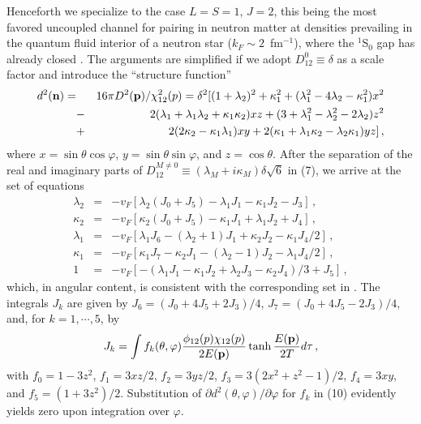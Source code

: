 Henceforth we specialize to the case $L=S=1$, $J=2$, this being 
the most favored uncoupled channel for pairing in neutron matter 
at densities prevailing in the quantum fluid interior of a neutron
star ($k_F\sim 2$~fm$^{-1}$), where the $^1$S$_0$ gap has already 
closed \cite{tak,kkc}.  The arguments are simplified if we adopt 
$D^0_{12}\equiv\delta$ as a scale factor and introduce the 
``structure function'' 
\begin{eqnarray}
    d^2({\bf n}) = 
&& 16\pi D^2({\bf p})/\chi_{12}^2(p)
   = \delta^2[(1+\lambda_2)^2+\kappa^2_1
     +(\lambda_1^2-4\lambda_2-\kappa^2_1)x^2 \nonumber\\
&-& 2(\lambda_1+ \lambda_1\lambda_2+\kappa_1\kappa_2) xz 
    +(3+\lambda^2_1-\lambda^2_2-2\lambda_2)z^2\nonumber\\
&+& 2(2\kappa_2-\kappa_1\lambda_1)xy
    +2(\kappa_1+ \lambda_1\kappa_2-\lambda_2\kappa_1)yz] \, ,
\end{eqnarray}
where $x=\sin\theta\cos\varphi$, 
$y=\sin\theta\sin\varphi$, and $z=\cos\theta$.  
After the separation of the real and imaginary parts of 
$D^{M\neq 0}_{12}\equiv (\lambda_M+i\kappa_M)\delta\sqrt{6}$ in (7), 
we arrive at the set of equations
\begin{eqnarray}
    \lambda_2
&=& -v_F[\lambda_2(J_0+J_5) -\lambda_1 J_1 -\kappa_1J_2-J_3]\, ,\nonumber \\
    \kappa_2
&=& -v_F[\kappa_2(J_0+J_5) -\kappa_1 J_1 +\lambda_1J_2+J_4] \, ,\nonumber\\
    \lambda_1
&=& -v_F[\lambda_1J_6-(\lambda_2+1)J_1+\kappa_2J_2-\kappa_1J_4/2]\, ,\nonumber\\
     \kappa_1
&=& -v_F[\kappa_1J_7-\kappa_2J_1-(\lambda_2-1)J_2-\lambda_1 J_4/2]\, ,\nonumber\\
    1
&=&-v_F[-(\lambda_1 J_1-\kappa_1 J_2+\lambda_2 J_3-\kappa_2 J_4)/3+J_5] \,,
\end{eqnarray}
which, in angular content, is consistent with the corresponding set 
in \cite{ost}.  The integrals $J_k$ are given by $J_6=(J_0+4J_5+2J_3)/4$, 
$J_7=(J_0+4J_5-2J_3)/4$, and, for $k=1,\cdots,5$, by
\begin{equation}
  J_k = \int f_k(\theta,\varphi){\phi_{12}(p)\chi_{12}(p)
        \over 2E({\bf p})}\tanh{E({\bf p})\over 2T}d\tau \, ,
\end{equation}
with
$f_0=1-3z^2$, $f_1=3xz/2$, $f_2=3yz/2$, $f_3=3(2x^2+z^2-1)/2$, $f_4=3xy$, 
and $f_5=(1+3z^2)/2$.
Substitution of $\partial d^2(\theta,\varphi)/\partial\varphi$ 
for $f_k$ in (10) evidently yields zero upon integration over $\varphi$. 
